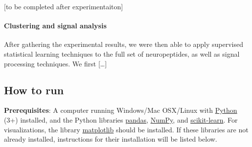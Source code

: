 \documentclass[]{article}
\let\oldparagraph\paragraph
\renewcommand{\paragraph}[1]{\oldparagraph{#1}\mbox{}}
\begin{document}
{[}to be completed after experimentaiton{]}

\hypertarget{clustering-and-signal-analysis}{%
\paragraph{Clustering and signal
analysis}\label{clustering-and-signal-analysis}}

After gathering the experimental results, we were then able to apply
supervised statistical learning techniques to the full set of
neuropeptides, as well as signal processing techniques. We first
{[}\ldots{}{]}

\hypertarget{how-to-run}{%
\subsection{How to run}\label{how-to-run}}

\textbf{Prerequisites}: A computer running Windows/Mac OSX/Linux with
\href{https://www.python.org/}{Python} (3+) installed, and the Python
libraries \href{https://pandas.pydata.org/}{pandas},
\href{https://numpy.org/}{NumPy}, and
\href{https://scikit-learn.org/stable/}{scikit-learn}. For
visualizations, the library \href{https://matplotlib.org/}{matplotlib}
should be installed. If these libraries are not already installed,
instructions for their installation will be listed below.
\end{document}
